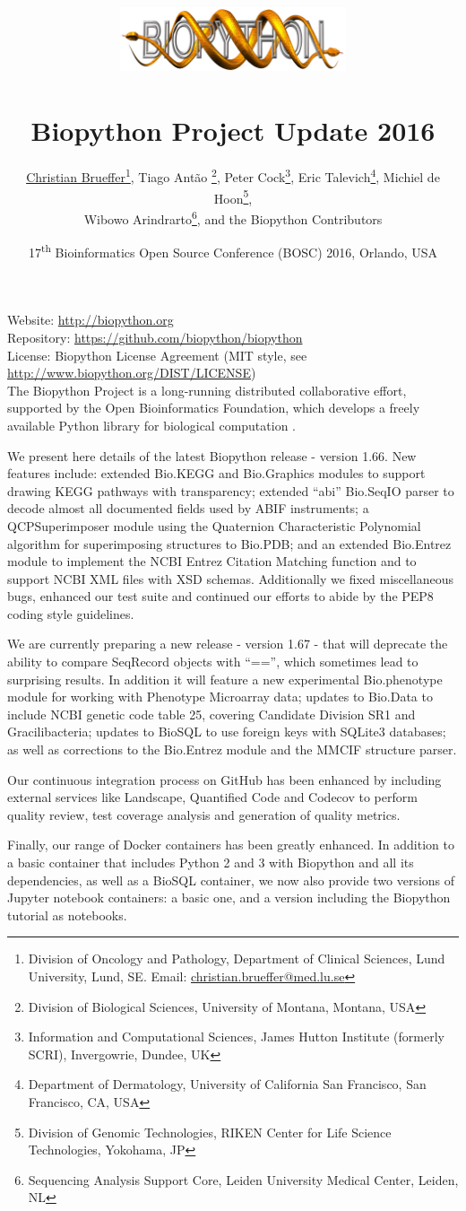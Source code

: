\documentclass[10pt,oneside]{article}
\title{%
\vspace{-1.5in}
\includegraphics[width=0.5\textwidth]{biopython.jpg}\\
~\\Biopython Project Update 2016}
\author{
	\underline{Christian Brueffer}\thanks{Division of Oncology and Pathology, Department of Clinical Sciences, Lund University, Lund, SE. Email: \href{mailto:christian.brueffer@med.lu.se}{christian.brueffer@med.lu.se}},
    Tiago Ant\~{a}o \thanks{Division of Biological Sciences, University of Montana, Montana, USA},
    Peter Cock\thanks{Information and Computational Sciences, James Hutton Institute (formerly SCRI), Invergowrie, Dundee, UK},
    Eric Talevich\thanks{Department of Dermatology, University of California San Francisco, San Francisco, CA, USA},
    Michiel de Hoon\thanks{Division of Genomic Technologies, RIKEN Center for Life Science Technologies, Yokohama, JP},
	\\
    Wibowo Arindrarto\thanks{Sequencing Analysis Support Core, Leiden University Medical Center, Leiden, NL},
    and the Biopython Contributors}
\date{17\textsuperscript{th} Bioinformatics Open Source Conference (BOSC) 2016, Orlando, USA}
\begin{document}
\maketitle
\thispagestyle{empty}

\vspace{-0.2in}
\noindent
Website: \url{http://biopython.org} \\
Repository: \url{https://github.com/biopython/biopython} \\
License: Biopython License Agreement (MIT style, see \url{http://www.biopython.org/DIST/LICENSE}) \\

The Biopython Project is a long-running distributed collaborative effort,
supported by the Open Bioinformatics Foundation, which develops a freely
available Python library for biological computation \cite{AppNote}.

We present here details of the latest Biopython release - version 1.66. New
features include: extended Bio.KEGG and Bio.Graphics modules to support drawing
KEGG pathways with transparency; extended ``abi'' Bio.SeqIO parser to decode
almost all documented fields used by ABIF instruments; a QCPSuperimposer
module using the Quaternion Characteristic Polynomial algorithm for superimposing
structures to Bio.PDB; and an extended Bio.Entrez module to implement the NCBI
Entrez Citation Matching function and to support NCBI XML files with XSD schemas.
Additionally we fixed miscellaneous bugs, enhanced our test suite and continued our
efforts to abide by the PEP8 coding style guidelines.

We are currently preparing a new release - version 1.67 - that will deprecate the
ability to compare SeqRecord objects with ``=='', which sometimes lead to surprising
results.  In addition it will feature a new experimental Bio.phenotype module for
working with Phenotype Microarray data; updates to Bio.Data to include NCBI genetic
code table 25, covering Candidate Division SR1 and Gracilibacteria; updates
to BioSQL to use foreign keys with SQLite3 databases; as well as corrections
to the Bio.Entrez module and the MMCIF structure parser.

Our continuous integration process on GitHub has been enhanced by including
external services like Landscape, Quantified Code and Codecov to perform
quality review, test coverage analysis and generation of quality metrics.

Finally, our range of Docker containers has been greatly enhanced. In addition to
a basic container that includes Python 2 and 3 with Biopython and all its
dependencies, as well as a BioSQL container, we now also provide two versions
of Jupyter notebook containers: a basic one, and a version including the
Biopython tutorial as notebooks.
\end{document}
